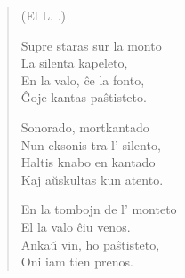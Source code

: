 \begin{verse}
\begin{center}
\footnotesize (El L. .)
\end{center}

                        Supre staras sur la monto\\
                        La silenta kapeleto,\\
                        En la valo, \^ce la fonto,\\
                        \^Goje kantas pa\^stisteto.

                        Sonorado, mortkantado\\
                        Nun eksonis tra l' silento, ---\\
                        Haltis knabo en kantado\\
                        Kaj a\u uskultas kun atento.

                        En la tombojn de l' monteto\\
                        El la valo \^ciu venos.\\
                        Anka\u u vin, ho pa\^stisteto,\\
                        Oni iam tien prenos.

\end{verse}


\smallrule{}
